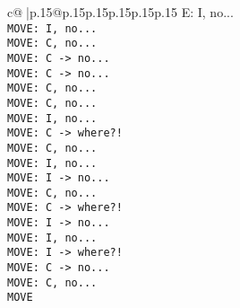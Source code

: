 \documentclass{article}
\begin{document}
{\begin{supertabular}{c@{$\;$}|p{.15\linewidth}@{}p{.15\linewidth}p{.15\linewidth}p{.15\linewidth}p{.15\linewidth}p{.15\linewidth}}
{{{E: I, no...\\ \tt  MOVE: I, no...\\ \tt  MOVE: C, no...\\ \tt  MOVE: C -> no...\\ \tt  MOVE: C -> no...\\ \tt  MOVE: C, no...\\ \tt  MOVE: C, no...\\ \tt  MOVE: I, no...\\ \tt  MOVE: C -> where?!\\ \tt  MOVE: C, no...\\ \tt  MOVE: I, no...\\ \tt  MOVE: I -> no...\\ \tt  MOVE: C, no...\\ \tt  MOVE: C -> where?!\\ \tt  MOVE: I -> no...\\ \tt  MOVE: I, no...\\ \tt  MOVE: I -> where?!\\ \tt  MOVE: C -> no...\\ \tt  MOVE: C, no...\\ \tt  MOVE}}}
\end{supertabular}}
\end{document}
